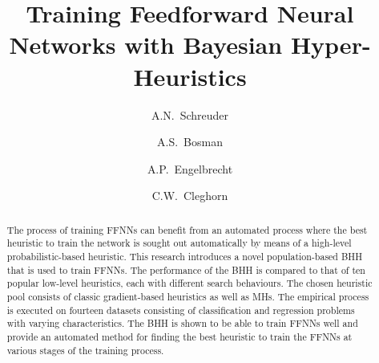 \documentclass[preprint,review,12pt]{elsarticle}
\begin{document}
\begin{frontmatter}
	\title{Training Feedforward Neural Networks with Bayesian Hyper-Heuristics}






	\author[aff:tuks]{A.N.~Schreuder}
	\author[aff:tuks]{A.S.~Bosman}
	\author[aff:stellenbosch,aff:kuwait]{A.P.~Engelbrecht}
	\author[aff:wits]{C.W.~Cleghorn}


	\begin{abstract}
		The process of training \acfp{FFNN} can benefit from an automated process where the best heuristic to train the network is sought out automatically by means of a high-level probabilistic-based heuristic. This research introduces a novel population-based \acf{BHH} that is used to train \acfp{FFNN}. The performance of the \acs{BHH} is compared to that of ten popular low-level heuristics, each with different search behaviours. The chosen heuristic pool consists of classic gradient-based heuristics as well as \acfp{MH}. The empirical process is executed on fourteen datasets consisting of classification and regression problems with varying characteristics. The \acs{BHH} is shown to be able to train \acp{FFNN} well and provide an automated method for finding the best heuristic to train the \acp{FFNN} at various stages of the training process.
	\end{abstract}


\end{frontmatter}
\end{document}
